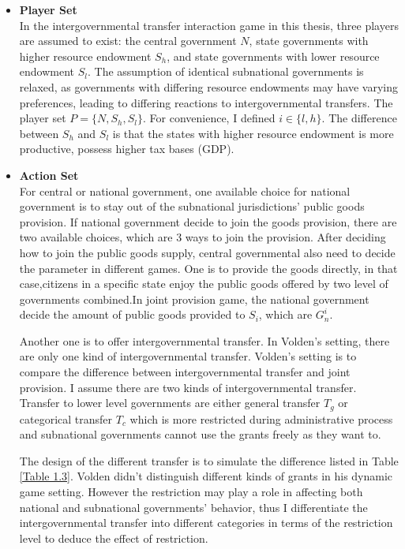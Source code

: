 \begin{itemize}
\item \textbf{Player Set}\\
In the intergovernmental transfer interaction game in this thesis, three players are assumed to exist: the central government $N$, state governments with higher resource endowment $S_h$, and state governments with lower resource endowment $S_l$. The assumption of identical subnational governments is relaxed, as governments with differing resource endowments may have varying preferences, leading to differing reactions to intergovernmental transfers. The player set $P = \{ N, S_h, S_l\}$. For convenience, I defined $i\in \{l,h\}$. \label{player} The difference between $S_h$ and $S_l$ is that the states with higher resource endowment is more productive, possess higher tax bases (GDP).

\item \textbf{Action Set}\\
For central or national government, one available choice for national government is to stay out of the subnational jurisdictions' public goods provision. If national government decide to join the goods provision, there are two available choices, which are 3 ways to join the provision. After deciding how to join the public goods supply, central governmental also need to decide the parameter in different games.  One is to provide the goods directly, in that case,citizens in a specific state enjoy the public goods offered by two level of governments combined.In joint provision game, the national government decide the amount of public goods provided to $S_i$, which are $G_n^i$.

Another one is to offer intergovernmental transfer. In Volden's setting, there are only one kind of intergovernmental transfer. Volden's setting is to compare the difference between intergovernmental transfer and joint provision. I assume there are two kinds of intergovernmental transfer. Transfer to lower level governments are either general transfer $T_g$ or categorical transfer $T_c$ which is more restricted during administrative process and subnational governments cannot use the grants freely as they want to. \label{transfer}

The design of the different transfer is to simulate the difference listed in Table \ref{Table 1.3}. Volden didn't distinguish different kinds of grants in his dynamic game setting. However the restriction may play a role in affecting both national and subnational governments' behavior, thus I differentiate the intergovernmental transfer into different categories in terms of the restriction level to deduce the effect of restriction.


\end{itemize}
